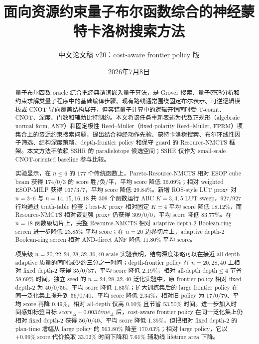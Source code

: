 \documentclass[UTF8,fontset=macnew,11pt]{ctexart}
\title{面向资源约束量子布尔函数综合的神经蒙特卡洛树搜索方法}
\author{中文论文稿 v20：cost-aware frontier policy 版}
\date{2026年7月8日}
\newcommand{\method}{Resource-NMCTS}
\newcommand{\screen}{Boolean-ring screen}
\newcommand{\anf}{\ensuremath{\mathrm{ANF}}}
\newcommand{\fprm}{\ensuremath{\mathrm{FPRM}}}
\begin{document}
\pagestyle{plain}
\maketitle

\begin{abstract}
量子布尔函数 oracle 综合把经典谓词嵌入量子算法，是 Grover 搜索、量子密码分析和约束求解类量子程序中的基础编译步骤。现有路线通常围绕固定布尔表示、可逆逻辑模板或 CNOT 导向覆盖结构展开，但容错量子计算中的逻辑开销同时受 T-count、CNOT、深度、门数和辅助比特制约。本文将该任务重新表述为代数正规形（algebraic normal form, \anf{}）和固定极性 Reed--Muller（fixed-polarity Reed--Muller, \fprm{}）项集合上的资源约束搜索问题，提出结合神经动作先验、蒙特卡洛树搜索、布尔环线性因子筛选、结构深度策略、depth-frontier policy 和保守 guard 的 \method{} 框架。本文方法不依赖 SSHR 的 parallelotope 候选空间；SSHR 仅作为 small-scale CNOT-oriented baseline 参与比较。

实验显示，在 $n\leq6$ 的 177 个传统函数上，Pareto-\method{} 相对 ESOP cube beam 获得 174/0/3 的 score 胜/负/平，平均 score 降低 36.09\%；相对 weighted ESOP-MILP 获得 167/3/7，平均 score 降低 29.84\%。新增 ROS-style LUT proxy 对 $n=3$--$6$ 与 $n=14,15,16,18$ 共 309 个函数运行 ABC $K=3,4,5$ LUT sweep，927/927 行均通过 truth-table 检查；best-$K$ proxy 相对固定 $K=4$ 平均 score 降低 18.12\%，而 \method{} 相对该更强 proxy 仍获得 309/0/0，平均 score 降低 83.77\%。在 $n=18$ 函数级切片上，完整 \method{} 相对 adaptive depth-2 \screen{} 进一步降低 23.85\% 平均 score；在 $n=20$ 边界切片上，adaptive depth-2 \screen{} 相对 AND-direct ANF 降低 11.80\% 平均 score。

项集级 $n=20,22,24,28,32,36,40$ scale 实验表明，结构深度策略可以在接近 all-depth adaptive 质量的同时减少约三分之一时间；depth-frontier policy 在 $n=20,28,40$ 上相对 fixed depth-2 获得 35/0/37，平均 score 降低 2.19\%，相对 all-depth depth$\leq4$ 节省 58.69\% 时间。独立 seed 的 $n=24,28,32,40$ 泛化实验中，原 frontier policy 相对 fixed depth-2 为 40/0/56、平均 score 降低 1.85\%；扩大训练集后的 large frontier policy 在同一泛化集上提升到 56/0/40、平均 score 降低 2.34\%，相对旧 policy 为 17/0/79、平均 score 再降 0.49\%，相对 all-depth 仅高 0.10\% 且节省 53.50\% 时间。进一步加入时间感知标签目标 $score_{\Delta}+0.003\,time_{\Delta}$ 后，cost-aware frontier policy 在同一泛化集上仍相对 fixed depth-2 获得 56/0/40、平均 score 降低 1.39\%，但把相对 fixed depth-2 的 plan-time 增幅从 large policy 的 563.80\% 降至 170.03\%；相对 large policy，它以 +0.99\% score 代价换取 33.02\% 时间下降和 7.61\% 辅助线 lifetime area 下降。


\end{abstract}
\end{document}
